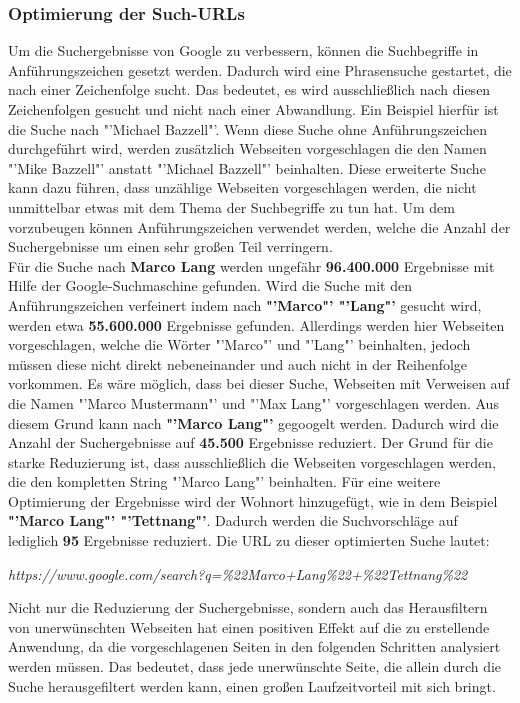 			\subsubsection{Optimierung der Such-URLs}
			\label{subsubsec:URLOptimieren}
			Um die Suchergebnisse von Google zu verbessern, können die Suchbegriffe in Anführungszeichen gesetzt werden. Dadurch wird eine Phrasensuche gestartet, die nach einer Zeichenfolge sucht. Das bedeutet, es wird ausschließlich nach diesen Zeichenfolgen gesucht und nicht nach einer Abwandlung. Ein Beispiel hierfür ist die Suche nach "'Michael Bazzell"'. Wenn diese Suche ohne Anführungszeichen durchgeführt wird, werden zusätzlich Webseiten vorgeschlagen die den Namen "'Mike Bazzell"' anstatt "'Michael Bazzell"' beinhalten. Diese erweiterte Suche kann dazu führen, dass unzählige Webseiten vorgeschlagen werden, die nicht unmittelbar etwas mit dem Thema der Suchbegriffe zu tun hat. Um dem vorzubeugen können Anführungszeichen verwendet werden, welche die Anzahl der Suchergebnisse um einen sehr großen Teil verringern. \cite{Bazzell}\\
			Für die Suche nach \textbf{Marco Lang} werden ungefähr \textbf{96.400.000} Ergebnisse mit Hilfe der Google-Suchmaschine gefunden. Wird die Suche mit den Anführungszeichen verfeinert indem nach \textbf{"'Marco"' "'Lang"'} gesucht wird, werden etwa \textbf{55.600.000} Ergebnisse gefunden. Allerdings werden hier Webseiten vorgeschlagen, welche die Wörter "'Marco"' und "'Lang"' beinhalten, jedoch müssen diese nicht direkt nebeneinander und auch nicht in der Reihenfolge vorkommen. Es wäre möglich, dass bei dieser Suche, Webseiten mit Verweisen auf die Namen "'Marco Mustermann"' und "'Max Lang"' vorgeschlagen werden. Aus diesem Grund kann nach \textbf{"'Marco Lang"'} gegoogelt werden. Dadurch wird die Anzahl der Suchergebnisse auf \textbf{45.500} Ergebnisse reduziert. Der Grund für die starke Reduzierung ist, dass ausschließlich die Webseiten vorgeschlagen werden, die den kompletten String "'Marco Lang"' beinhalten. Für eine weitere Optimierung der Ergebnisse wird der Wohnort hinzugefügt, wie in dem Beispiel \textbf{"'Marco Lang"' "'Tettnang"'}. Dadurch werden die Suchvorschläge auf lediglich \textbf{95} Ergebnisse reduziert. Die URL zu dieser optimierten Suche lautet: 
			
			\textit{https://www.google.com/search?q=\%22Marco+Lang\%22+\%22Tettnang\%22}
			
			Nicht nur die Reduzierung der Suchergebnisse, sondern auch das Herausfiltern von unerwünschten Webseiten hat einen positiven Effekt auf die zu erstellende Anwendung, da die vorgeschlagenen Seiten in den folgenden Schritten analysiert werden müssen. Das bedeutet, dass jede unerwünschte Seite, die allein durch die Suche herausgefiltert werden kann, einen großen Laufzeitvorteil mit sich bringt. 
			
